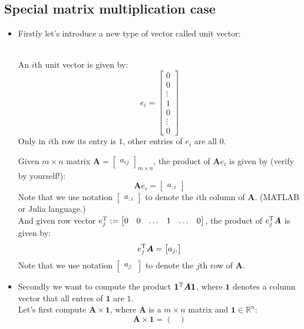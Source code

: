 \subsection{Special matrix multiplication case}
\begin{itemize}
\item
Firstly let's introduce a new type of vector called unit vector:
\begin{definition}\qquad \\
An $i$th unit vector is given by:
\[
e_i = \begin{bmatrix}
0\\0\\ \vdots \\ 1 \\ 0 \\ \vdots \\ 0
\end{bmatrix}
\]
Only in $i$th row its entry is $1$, other entries of $e_i$ are all $0$.
\end{definition}
Given $m\times n$ matrix $\bm A = \begin{bmatrix}
a_{ij}
\end{bmatrix}_{m\times n}$, the product of $\bm Ae_i$ is given by (verify by yourself!):
\[
\bm Ae_i = \begin{bmatrix}
a_{:i}
\end{bmatrix}
\]
Note that we use notation $\begin{bmatrix}
a_{:i}
\end{bmatrix}$ to denote the $i$th column of $\bm A$. (MATLAB or Julia language.)\\
And given row vector $e_j^{\mathrm T} :=\begin{bmatrix}
0&0& \ldots& 1& \ldots&0
\end{bmatrix}$, the product of $e_j^{\mathrm T}\bm A$ is given by:
\[
e_j^{\mathrm T}\bm A = \begin{bmatrix}
a_{j:}
\end{bmatrix}
\]
Note that we use notation $\begin{bmatrix}
a_{j:}
\end{bmatrix}$ to denote the $j$th row of $\bm A$.
\newpage
\item
Secondly we want to compute the product $\bm 1^{\mathrm T}\bm A\bm 1$, where $\bm 1$ denotes a column vector that all entres of $\bm 1$ are $1$.\\
Let's first compute $\bm A\times\bm 1$, where $\bm A$ is a $m\times n$ matrix and $\bm 1\in\mathbb{R}^n$:
\[
\bm A\times\bm 1 = \begin{pmatrix}

\end{pmatrix}\]
\end{itemize}
